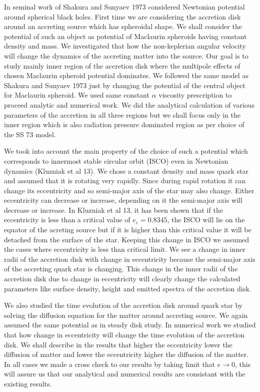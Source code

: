 \documentclass[useAMS,usenatbib]{mn2e}
\begin{document}
In seminal work of Shakura and Sunyaev 1973 considered Newtonian potential around spherical black holes. First time we are considering the accretion disk around an accreting source which has spheroidal shape. We shall consider the potential of such an object as potential of Maclaurin spheroids having constant density and mass. We investigated that how the non-keplerian angular velocity will change the dynamics of the accreting matter into the source. Our goal is to study mainly inner region of the accretion disk where the multipole effects of chosen Maclaurin spheroid potential dominates. We followed the same model as Shakura and Sunyaev 1973 just by changing the potential of the central object for Maclaurin spheroid. We used same constant $\alpha$ viscosity prescription to proceed analytic and numerical work. We did the analytical calculation of various parameters of the accretion in all three regions but we shall focus only in the inner region which is also radiation pressure dominated region as per choice of the SS 73 model. 

We took into account the main property of the choice of such a potential which corresponds to innermost stable circular orbit (ISCO) even in Newtonian dynamics (Kluzniak et al 13). We chose a constant density and mass quark star and assumed that it is rotating very rapidly. Since during rapid rotation it can change its eccentricity and so semi-major axis of the star may also change. Either eccentricity can decrease or increase, depending on it the semi-major axis will decrease or increase. In Kluzniak et al 13, it has been shown that if the eccentricity is less than a critical value of $e_c = 0.8345$, the ISCO will lie on the equator of the acreting source but if it is higher than this critical value it will be detached from the surface of the star. Keeping this change in ISCO we assumed the cases where eccentricity is less than critical limit. We see a change in inner radii of the accretion disk with change in eccentricity because the semi-major axis of the accreting quark star is changing. This change in the inner radii of the accretion disk due to change in eccentricity will clearly change the calculated parameters like surface density, height and emitted spectra of the accretion disk.

We also studied the time evolution of the accretion disk around quark star by solving the diffusion equation for the matter around accreting source. We again assumed the same potential as in steady disk study. In numerical work we studied that how change in eccentricity will change the time evolution of the accretion disk. We shall describe in the results that higher the eccentricity lower the diffusion of matter and lower the eccentricity higher the diffusion of the matter. In all cases we made a cross check to our results by taking limit that $e\rightarrow0$, this will assure us that our analytical and numerical results are consistant with the existing results.
\end{document}
